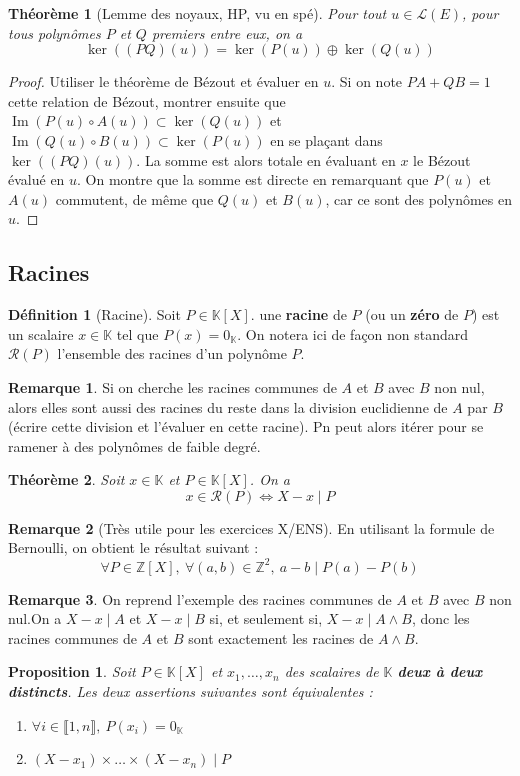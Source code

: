 \documentclass[french]{book}
\newcommand{\Z}{\mathbb{Z}}
\newcommand{\K}{\mathbb{K}}
\theoremstyle{plain}
\newtheorem{thm}{Théorème}[chapter]
\newtheorem{prop}{Proposition}[chapter]
\theoremstyle{definition}
\newtheorem{dfn}{Définition}[chapter]
\newtheorem{rmq}{Remarque}[chapter]
\theoremstyle{remark}
\DeclareMathOperator{\im}{Im}
\begin{document}
\begin{thm}[Lemme des noyaux, HP, vu en spé]
	Pour tout $u\in\mathcal{L}(E)$, pour tous polynômes $P$ et $Q$ premiers entre eux, on a $$\ker((PQ)(u))=\ker(P(u))\oplus\ker(Q(u))$$
\end{thm}
\begin{proof}
	Utiliser le théorème de Bézout et évaluer en $u$. Si on note $PA+QB=1$ cette relation de Bézout, montrer ensuite que $\im(P(u)\circ A(u))\subset\ker(Q(u))$ et $\im(Q(u)\circ B(u))\subset\ker(P(u))$ en se plaçant dans $\ker((PQ)(u))$. La somme est alors totale en évaluant en $x$ le Bézout évalué en $u$. On montre que la somme est directe en remarquant que $P(u)$ et $A(u)$ commutent, de même que $Q(u)$ et $B(u)$, car ce sont des polynômes en $u$.
\end{proof}
\subsection{Racines}
\begin{dfn}[Racine]
	Soit $P\in\K[X]$. une \textbf{racine} de $P$ (ou un \textbf{zéro} de $P$) est un scalaire $x\in\K$ tel que $P(x)=0_\K$. On notera ici de façon non standard $\mathcal{R}(P)$ l'ensemble des racines d'un polynôme $P$.
\end{dfn}
\begin{rmq}
	Si on cherche les racines communes de $A$ et $B$ avec $B$ non nul, alors elles sont aussi des racines du reste dans la division euclidienne de $A$ par $B$ (écrire cette division et l'évaluer en cette racine). Pn peut alors itérer pour se ramener à des polynômes de faible degré.
\end{rmq}
\begin{thm}
	Soit $x\in\K$ et $P\in\K[X]$. On a $$x\in\mathcal{R}(P) \Longleftrightarrow X-x\mid P$$
\end{thm}
\begin{rmq}[Très utile pour les exercices X/ENS]
	En utilisant la formule de Bernoulli, on obtient le résultat suivant : $$\forall P\in\Z[X],\ \forall (a,b)\in\Z^2,\ a-b\mid P(a)-P(b)$$
\end{rmq}
\begin{rmq}
	On reprend l'exemple des racines communes de $A$ et $B$ avec $B$ non nul.On a  $X-x\mid A$ et $X-x\mid B$ si, et seulement si, $X-x\mid A\wedge B$, donc les racines communes de $A$ et $B$ sont exactement les racines de $A\wedge B$.
\end{rmq}
\begin{prop}
	Soit $P\in\K[X]$ et $x_1,\ldots,x_n$ des scalaires de $\K$ \textbf{deux à deux distincts}. Les deux assertions suivantes sont équivalentes :
	\begin{enumerate}
		\item $\forall i\in\llbracket1,n\rrbracket,\ P(x_i)=0_\K$
		\item $(X-x_1)\times\ldots\times(X-x_n)\mid P$
	\end{enumerate}
\end{prop}
\end{document}
